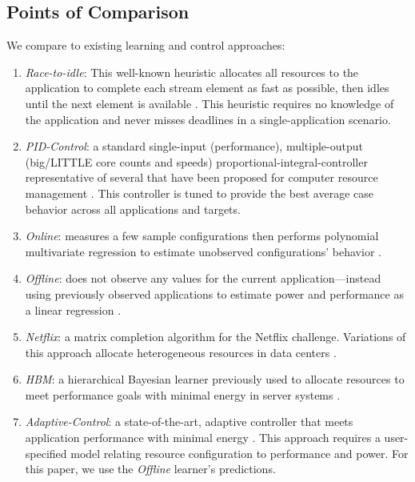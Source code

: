 \subsection{Points of Comparison}
We compare to existing learning and control approaches:
\begin{enumerate}[leftmargin=1em]
\item \textit{Race-to-idle}: This well-known heuristic allocates all
  resources to the application to complete each stream element as fast
  as possible, then idles until the next element is available
  \cite{kim-cpsna,powerslope,LeSueur11}.  This heuristic requires no
  knowledge of the application and never misses deadlines in a
  single-application scenario.
\item \textit{PID-Control}: a standard single-input (performance),
  multiple-output (big/LITTLE core counts and speeds)
  prop\-ortional-integral-controller representative of several that
  have been proposed for computer resource management
  \cite{Hellerstein2004a,METE}.  This controller is tuned to provide
  the best average case behavior across all applications and targets.
\item \textit{Online}: measures a few sample configurations then
  performs polynomial multivariate regression to estimate unobserved
  configurations' behavior \cite{LEO,Li2006,Ponamarev}.
\item \textit{Offline}: does not observe any values for the current
  application---instead using previously observed applications to
  estimate power and performance as a linear regression
  \cite{PUPiL,LeeBrooks2006,CPR}.
\item \textit{Netflix}: a matrix completion algorithm for the
  Netflix challenge. Variations of this approach allocate
  heterogeneous resources in data centers \cite{Paragon,quasar}.
\item \textit{HBM}: a hierarchical Bayesian learner previously used
  to allocate resources to meet performance goals with minimal energy
  in server systems \cite{LEO}.
\item \textit{Adaptive-Control}: a state-of-the-art, adaptive
  controller that meets application performance with minimal energy
  \cite{POET}.  This approach requires a user-specified model relating
  resource configuration to performance and power.  For this paper, we
  use the \emph{Offline} learner's predictions.  
\end{enumerate}



